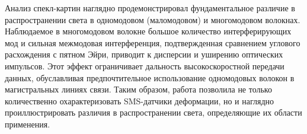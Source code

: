 Анализ спекл-картин наглядно продемонстрировал фундаментальное различие в распространении света в одномодовом (маломодовом) и многомодовом волокнах. Наблюдаемое в многомодовом волокне большое количество интерферирующих мод и сильная межмодовая интерференция, подтвержденная сравнением углового расхождения с пятном Эйри, приводит к дисперсии и уширению оптических импульсов. Этот эффект ограничивает дальность высокоскоростной передачи данных, обуславливая предпочтительное использование одномодовых волокон в магистральных линиях связи. Таким образом, работа позволила не только количественно охарактеризовать SMS-датчики деформации, но и наглядно проиллюстрировать различия в распространении света, определяющие их области применения.
